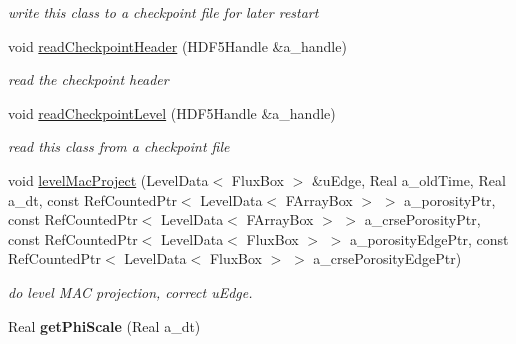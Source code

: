 \begin{DoxyCompactItemize}
\begin{DoxyCompactList}\small\item\em write this class to a checkpoint file for later restart \end{DoxyCompactList}\item 
\hypertarget{class_c_c_projector_a61eac81bacc310cc46a9cbfb4b140601}{void \hyperlink{class_c_c_projector_a61eac81bacc310cc46a9cbfb4b140601}{read\-Checkpoint\-Header} (H\-D\-F5\-Handle \&a\-\_\-handle)}\label{class_c_c_projector_a61eac81bacc310cc46a9cbfb4b140601}

\begin{DoxyCompactList}\small\item\em read the checkpoint header \end{DoxyCompactList}\item 
\hypertarget{class_c_c_projector_abb282f36626a6ba9a298e9723e8f4161}{void \hyperlink{class_c_c_projector_abb282f36626a6ba9a298e9723e8f4161}{read\-Checkpoint\-Level} (H\-D\-F5\-Handle \&a\-\_\-handle)}\label{class_c_c_projector_abb282f36626a6ba9a298e9723e8f4161}

\begin{DoxyCompactList}\small\item\em read this class from a checkpoint file \end{DoxyCompactList}\item 
\hypertarget{class_c_c_projector_adc813efc7d9cdae9598a316cd97fb566}{void \hyperlink{class_c_c_projector_adc813efc7d9cdae9598a316cd97fb566}{level\-Mac\-Project} (Level\-Data$<$ Flux\-Box $>$ \&u\-Edge, Real a\-\_\-old\-Time, Real a\-\_\-dt, const Ref\-Counted\-Ptr$<$ Level\-Data$<$ F\-Array\-Box $>$ $>$ a\-\_\-porosity\-Ptr, const Ref\-Counted\-Ptr$<$ Level\-Data$<$ F\-Array\-Box $>$ $>$ a\-\_\-crse\-Porosity\-Ptr, const Ref\-Counted\-Ptr$<$ Level\-Data$<$ Flux\-Box $>$ $>$ a\-\_\-porosity\-Edge\-Ptr, const Ref\-Counted\-Ptr$<$ Level\-Data$<$ Flux\-Box $>$ $>$ a\-\_\-crse\-Porosity\-Edge\-Ptr)}\label{class_c_c_projector_adc813efc7d9cdae9598a316cd97fb566}

\begin{DoxyCompactList}\small\item\em do level M\-A\-C projection, correct u\-Edge. \end{DoxyCompactList}\item 
\hypertarget{class_c_c_projector_a5a1eef04875d51a7c4a922a77175c077}{Real {\bfseries get\-Phi\-Scale} (Real a\-\_\-dt)}\label{class_c_c_projector_a5a1eef04875d51a7c4a922a77175c077}


\end{DoxyCompactItemize}
